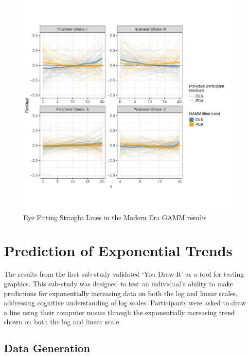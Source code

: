 \documentclass[print]{nuthesis}
\begin{document}
\begin{figure}
\includegraphics[width=1\linewidth]{thesis_files/figure-latex/eyefitting-gamm-residualplots-1} \caption{Eye Fitting Straight Lines in the Modern Era GAMM results}\label{fig:eyefitting-gamm-residualplots}
\end{figure}

\hypertarget{prediction-of-exponential-trends}{%
\section{Prediction of Exponential Trends}\label{prediction-of-exponential-trends}}

The results from the first sub-study validated `You Draw It' as a tool for testing graphics.
This sub-study was designed to test an individual's ability to make predictions for exponentially increasing data on both the log and linear scales, addressing cognitive understanding of log scales.
Participants were asked to draw a line using their computer mouse through the exponentially increasing trend shown on both the log and linear scale.

\hypertarget{data-generation-2}{%
\subsection{Data Generation}\label{data-generation-2}}
\end{document}
